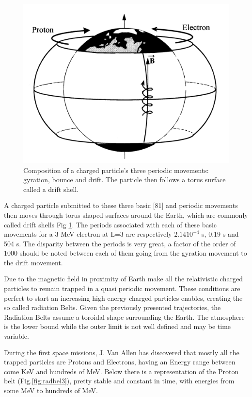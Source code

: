 \documentclass[./dissertation.tex]{subfiles}
\begin{document}
\begin{figure}[h!]
\centering
  \includegraphics[scale = 0.50]{imgs/radbelt2.png}
  \caption{Composition of a charged particle's three periodic movements: gyration, bounce and drift. The particle then follows a torus surface called a drift shell. \cite{bib2}}
  \label{fig:radbel2}
\end{figure}

A charged particle submitted to these three basic [81] and
periodic movements then moves through torus shaped surfaces
around the Earth, which are commonly called drift shells Fig \ref{fig:radbel2}. The periods associated with each of these basic
movements for a 3 MeV electron at L=3 are respectively $2.14 10^{-4}$
s, 0.19 s and 504 s. The disparity between the periods is
very great, a factor of the order of 1000 should be noted
between each of them going from the gyration movement to
the drift movement.

Due to the magnetic field in proximity of Earth make all the relativistic charged particles to remain trapped in a quasi periodic movement. These conditions are perfect to start an increasing high energy charged particles enables, creating the so called radiation Belts.
Given the previously presented trajectories, the Radiation Belts assume a toroidal shape surrounding the Earth. The atmosphere is the lower bound while the outer limit is not well defined and may be time variable.

During the first space missions, J. Van Allen has discovered that mostly all the trapped particles are Protons and Electrons, having an Energy range between come KeV and hundreds of MeV. Below there is a representation of the Proton belt (Fig.\ref{fig:radbel3}), pretty stable and constant in time, with energies from some MeV to hundreds of MeV.
\end{document}
